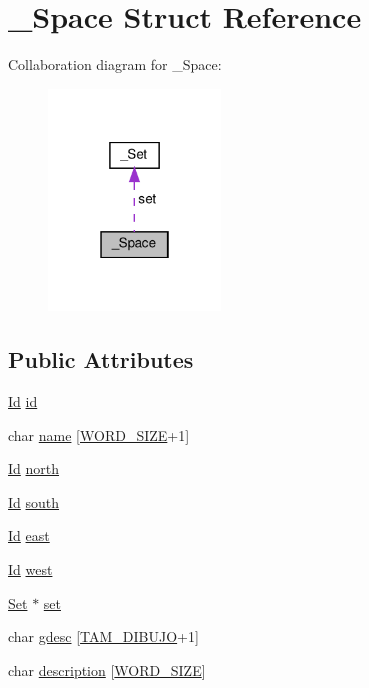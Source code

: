 \hypertarget{struct__Space}{}\section{\+\_\+\+Space Struct Reference}
\label{struct__Space}


Collaboration diagram for \+\_\+\+Space\+:\nopagebreak
\begin{figure}[H]
\begin{center}
\leavevmode
\includegraphics[width=130pt]{struct__Space__coll__graph}
\end{center}
\end{figure}
\subsection*{Public Attributes}
\begin{DoxyCompactItemize}
\item 
\hyperlink{types_8h_a845e604fb28f7e3d97549da3448149d3}{Id} \hyperlink{struct__Space_a70cb461deb9ac073e401b607339b567f}{id}
\item 
char \hyperlink{struct__Space_aa1c9c994c2d16ecf3ef46138685fdfdc}{name} \mbox{[}\hyperlink{types_8h_a92ed8507d1cd2331ad09275c5c4c1c89}{W\+O\+R\+D\+\_\+\+S\+I\+ZE}+1\mbox{]}
\item 
\hyperlink{types_8h_a845e604fb28f7e3d97549da3448149d3}{Id} \hyperlink{struct__Space_ae5ebe53ce79514d7d2d93911e0159252}{north}
\item 
\hyperlink{types_8h_a845e604fb28f7e3d97549da3448149d3}{Id} \hyperlink{struct__Space_a646b68c22a0bbf1685033c96109d31d1}{south}
\item 
\hyperlink{types_8h_a845e604fb28f7e3d97549da3448149d3}{Id} \hyperlink{struct__Space_a41ce2bf33cf0c157b358221f094ee05b}{east}
\item 
\hyperlink{types_8h_a845e604fb28f7e3d97549da3448149d3}{Id} \hyperlink{struct__Space_a20c1d259e93b44e24ba82982e142eb9b}{west}
\item 
\hyperlink{set_8h_a6d3b7f7c92cbb4577ef3ef7ddbf93161}{Set} $\ast$ \hyperlink{struct__Space_a115dbdeddf8b1e12889b4ab99945995d}{set}
\item 
char \hyperlink{struct__Space_af311939768f2208925e07a50ebd3f045}{gdesc} \mbox{[}\hyperlink{space_8h_a894ebc9b2098fe63607e0ca2e5f5ce8d}{T\+A\+M\+\_\+\+D\+I\+B\+U\+JO}+1\mbox{]}
\item 
char \hyperlink{struct__Space_a2a50aacb78d1d0f65f5b14f94ed81d80}{description} \mbox{[}\hyperlink{types_8h_a92ed8507d1cd2331ad09275c5c4c1c89}{W\+O\+R\+D\+\_\+\+S\+I\+ZE}\mbox{]}
\end{DoxyCompactItemize}


